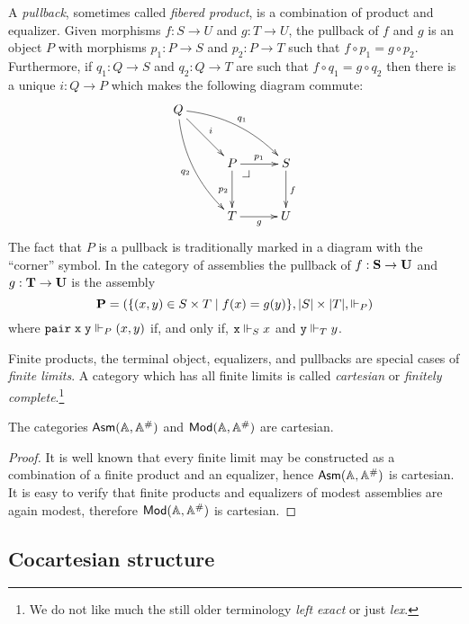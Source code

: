 A \emph{pullback}, sometimes called \emph{fibered product}, is a
combination of product and equalizer. Given morphisms $f : S \to U$
and $g : T \to U$, the pullback of $f$ and $g$ is an object $P$ with
morphisms $p_1 : P \to S$ and $p_2 : P \to T$ such that $f \circ p_1 =
g \circ p_2$. Furthermore, if $q_1 : Q \to S$ and $q_2 : Q \to T$ are
such that $f \circ q_1 = g \circ q_2$ then there is a unique $i : Q
\to P$ which makes the following diagram commute:
%
\begin{equation*}
  \xymatrix@+0.5em{
    {Q}
    \ar[dr]^{i}
    \ar@/_1em/[ddr]_{q_2}
    \ar@/^1em/[rrd]^{q_1}
    &
    &
    \\
    &
    {P} \pbcorner
    \ar[r]^{p_1}
    \ar[d]_{p_2}
    &
    {S}
    \ar[d]^{f}
    \\
    &
    {T}
    \ar[r]_{g}
    &
    {U}
  }
\end{equation*}
%
The fact that $P$ is a pullback is traditionally marked in a diagram
with the ``corner'' symbol. In the category of assemblies the pullback
of $f : \mathbf{S} \to \mathbf{U}$ and $g : \mathbf{T} \to \mathbf{U}$ is the
assembly
%
\begin{equation*}
  \mathbf{P} = (\{(x,y) \in S \times T \mid f(x) = g(y)\}, |S| \times
  |T|, {\Vdash_P})
\end{equation*}
%
where $\mathtt{pair}\;\mathtt{x}\;\mathtt{y} \Vdash_P (x,y)$ if, and only if, $\mathtt{x}
\Vdash_S x$ and $\mathtt{y} \Vdash_T y$.

Finite products, the terminal object, equalizers, and pullbacks are
special cases of \emph{finite limits}. A category which has all finite
limits is called \emph{cartesian} or \emph{finitely
  complete}.\footnote{We do not like much the still older terminology
  \emph{left exact} or just \emph{lex}.}

\begin{proposition}
  The categories $\mathsf{Asm}(\mathbb{A},\mathbb{A}^{\#})$ and $\mathsf{Mod}(\mathbb{A}, \mathbb{A}^{\#})$ are cartesian.
\end{proposition}

\begin{proof}
  It is well known that every finite limit may be constructed as a
  combination of a finite product and an equalizer, hence $\mathsf{Asm}(\mathbb{A},\mathbb{A}^{\#})$ is
  cartesian. It is easy to verify that finite products and equalizers
  of modest assemblies are again modest, therefore $\mathsf{Mod}(\mathbb{A},
    \mathbb{A}^{\#})$ is cartesian.
\end{proof}


\subsection{Cocartesian structure}
\label{sec:cocartesian-structure}


